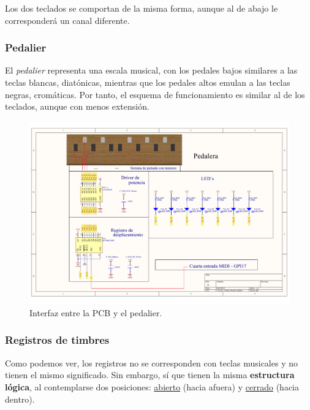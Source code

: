 \smallskip

Los dos teclados se comportan de la misma forma, aunque al de abajo le corresponderá un canal diferente.

\subsubsection{Pedalier}

El \textit{pedalier} representa una escala musical, con los pedales bajos similares a las teclas blancas, diatónicas, mientras que los pedales altos emulan a las teclas negras, cromáticas. Por tanto, el esquema de funcionamiento es similar al de los teclados, aunque con menos extensión.

\smallskip

\begin{figure}[H]
	\noindent \begin{centering}
		\includegraphics[width=\linewidth*2/3]{capitulo3/pcb_pedalier}
		\par\end{centering}
	\smallskip
	\caption{\label{fig:pcb_pedalier} Interfaz entre la PCB y el pedalier.}
\end{figure} 

\smallskip

\subsubsection{Registros de timbres}

Como podemos ver, los registros no se corresponden con teclas musicales y no tienen el mismo significado. Sin embargo, sí que tienen la misma \textbf{estructura lógica}, al contemplarse dos posiciones: \underline{abierto} (hacia afuera) y \underline{cerrado} (hacia dentro).

